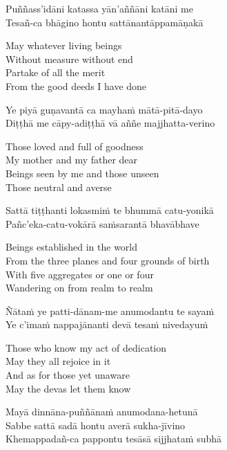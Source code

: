 \begin{leader}
\end{leader}

Puññass’idāni katassa yān’aññāni katāni me\\
Tesañ-ca bhāgino hontu sattānantāppamāṇakā

\begin{cprenglish}
  May whatever living beings\\
  Without measure without end\\
  Partake of all the merit\\
  From the good deeds I have done
\end{cprenglish}

Ye piyā guṇavantā ca mayhaṁ mātā-pitā-dayo\\
Diṭṭhā me cāpy-adiṭṭhā vā aññe majjhatta-verino

\begin{cprenglish}
  Those loved and full of goodness\\
  My mother and my father dear\\
  Beings seen by me and those unseen\\
  Those neutral and averse
\end{cprenglish}

Sattā tiṭṭhanti lokasmiṁ te bhummā catu-yonikā\\
Pañc’eka-catu-vokārā saṁsarantā bhavābhave

\begin{cprenglish}
  Beings established in the world\\
  From the three planes and four grounds of birth\\
  With five aggregates or one or four\\
  Wandering on from realm to realm
\end{cprenglish}

Ñātaṁ ye patti-dānam-me anumodantu te sayaṁ\\
Ye c’imaṁ nappajānanti devā tesaṁ nivedayuṁ

\begin{cprenglish}
  Those who know my act of dedication\\
  May they all rejoice in it\\
  And as for those yet unaware\\
  May the devas let them know
\end{cprenglish}

Mayā dinnāna-puññānaṁ anumodana-hetunā\\
Sabbe sattā sadā hontu averā sukha-jīvino\\
Khemappadañ-ca pappontu tesāsā sijjhataṁ subhā

